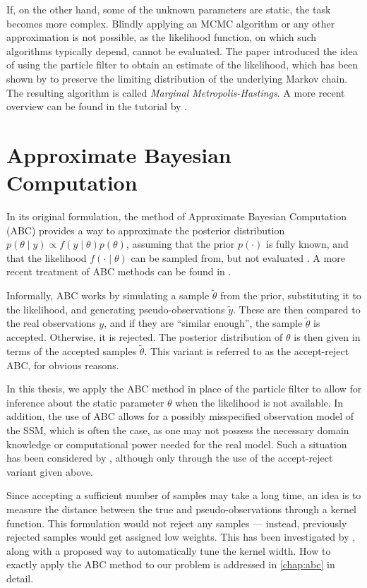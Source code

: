 If, on the other hand, some of the unknown parameters are static, the task becomes more complex. Blindly applying an MCMC algorithm or any other approximation is not possible, as the likelihood function, on which such algorithms typically depend, cannot be evaluated. The paper \cite{andrieu} introduced the idea of using the particle filter to obtain an estimate of the likelihood, which has been shown by \cite{del-moral} to preserve the limiting distribution of the underlying Markov chain. The resulting algorithm is called \textit{Marginal Metropolis-Hastings}. A more recent overview can be found in the tutorial by \cite{schoen}.

\section{Approximate Bayesian Computation}
In its original formulation, the method of Approximate Bayesian Computation (ABC) provides a way to approximate the posterior distribution $p(\theta \mid y) \propto f(y \mid \theta) p(\theta)$, assuming that the prior $p(\cdot)$ is fully known, and that the likelihood $f(\cdot \mid \theta)$ can be sampled from, but not evaluated \citep{abc-old-old, abc-old}. A more recent treatment of ABC methods can be found in \cite{abc-recent}.

Informally, ABC works by simulating a sample $\tilde{\theta}$ from the prior, substituting it to the likelihood, and generating pseudo-observations $\tilde{y}$. These are then compared to the real observations $y$, and if they are ``similar enough'', the sample $\tilde{\theta}$ is accepted. Otherwise, it is rejected. The posterior distribution of $\theta$ is then given in terms of the accepted samples $\tilde{\theta}$. This variant is referred to as the accept-reject ABC, for obvious reasons.

In this thesis, we apply the ABC method in place of the particle filter to allow for inference about the static parameter $\theta$ when the likelihood is not available. In addition, the use of ABC allows for a possibly misspecified observation model of the SSM, which is often the case, as one may not possess the necessary domain knowledge or computational power needed for the real model. Such a situation has been considered by \cite{jasra-time-series}, although only through the use of the accept-reject variant given above.

Since accepting a sufficient number of samples may take a long time, an idea is to measure the distance between the true and pseudo-observations through a kernel function. This formulation would not reject any samples --- instead, previously rejected samples would get assigned low weights. This has been investigated by \cite{dedecius}, along with a proposed way to automatically tune the kernel width. How to exactly apply the ABC method to our problem is addressed in \autoref{chap:abc} in detail.

